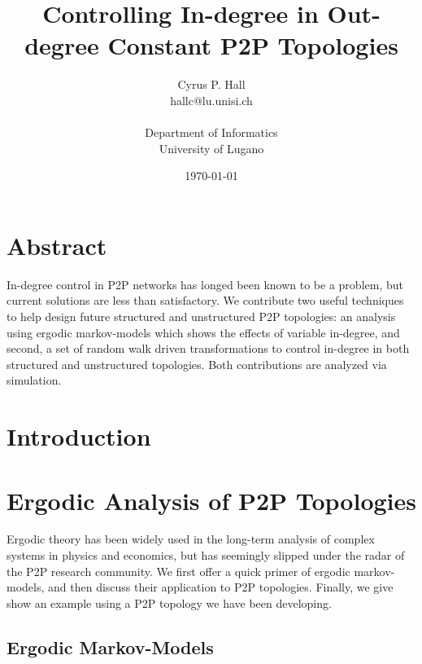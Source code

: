 \documentclass[a4paper,12pt]{article}
\begin{document}
\title{Controlling In-degree in Out-degree Constant P2P Topologies}
\date{\today}
\author{Cyrus P. Hall\\
  hallc@lu.unisi.ch\\
  \\
  Department of Informatics\\
  University of Lugano\\
}
\maketitle

\section*{Abstract}
In-degree control in P2P networks has longed been known to be a problem, but
current solutions are less than satisfactory.  We contribute two useful
techniques to help design future structured and unstructured P2P topologies: an
analysis using ergodic markov-models which shows the effects of variable
in-degree, and second, a set of random walk driven transformations to control
in-degree in both structured and unstructured topologies.  Both contributions
are analyzed via simulation.

\section{Introduction}

\section{Ergodic Analysis of P2P Topologies}

Ergodic theory has been widely used in the long-term analysis of complex
systems in physics and economics, but has seemingly slipped under the radar of
the P2P research community.  We first offer a quick primer of ergodic
markov-models, and then discuss their application to P2P topologies.  Finally,
we give show an example using a P2P topology we have been developing. 

\subsection{Ergodic Markov-Models}
\end{document}

